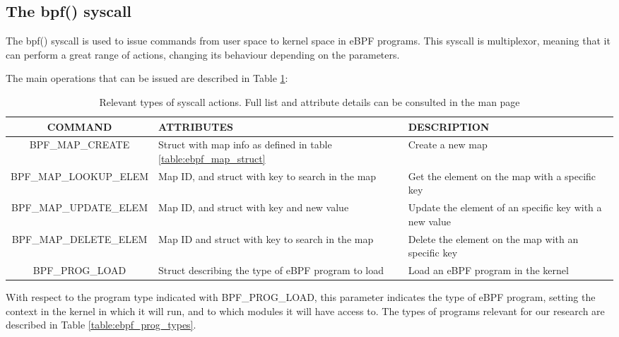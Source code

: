 
\subsection{The bpf() syscall} \label{subsection:bpf_syscall}
The bpf() syscall is used to issue commands from user space to kernel space in eBPF programs. This syscall is multiplexor, meaning that it can perform a great range of actions, changing its behaviour depending on the parameters.

The main operations that can be issued are described in Table \ref{table:ebpf_syscall}:

\begin{table}[htbp]
\begin{tabular}{|c|>{\centering\arraybackslash}p{4cm}|>{\centering\arraybackslash}p{4cm}|}
\hline
\textbf{COMMAND} & \textbf{ATTRIBUTES} & \textbf{DESCRIPTION}\\
\hline
\hline
BPF\_MAP\_CREATE & Struct with map info as defined in table \ref{table:ebpf_map_struct} & Create a new map\\
\hline
BPF\_MAP\_LOOKUP\_ELEM & Map ID, and struct with key to search in the map & Get the element on the map with a specific key\\
\hline
BPF\_MAP\_UPDATE\_ELEM & Map ID, and struct with key and new value & Update the element of an specific key with a new value\\
\hline
BPF\_MAP\_DELETE\_ELEM & Map ID and struct with key to search in the map & Delete the element on the map with an specific key\\
\hline
BPF\_PROG\_LOAD & Struct describing the type of eBPF program to load & Load an eBPF program in the kernel\\
\hline
\end{tabular}
\caption{Relevant types of syscall actions. Full list and attribute details can be consulted in the man page \cite{bpf_syscall}}
\label{table:ebpf_syscall}
\end{table}

With respect to the program type indicated with BPF\_PROG\_LOAD, this parameter indicates the type of eBPF program, setting the context in the kernel in which it will run, and to which modules it will have access to. The types of programs relevant for our research are described in Table \ref{table:ebpf_prog_types}.

